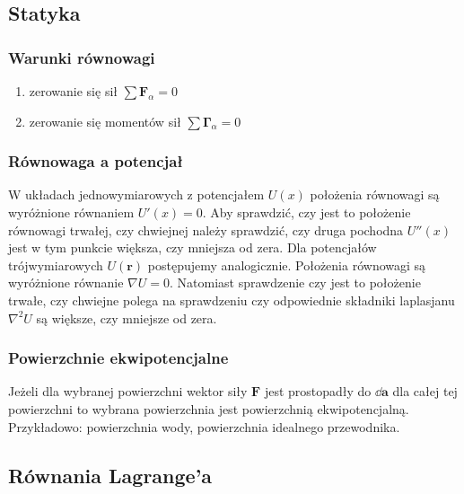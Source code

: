 \documentclass[../main.tex]{subfiles}
\begin{document}
\subsection{Statyka}
\subsubsection*{Warunki równowagi}
\begin{enumerate}
    \item zerowanie się sił \(\sum\mathbf{F}_\alpha=0\)
    \item zerowanie się momentów sił \(\sum\boldsymbol{\Gamma}_\alpha=0\)
\end{enumerate}
\subsubsection{Równowaga a potencjał}
W układach jednowymiarowych z potencjałem \(U(x)\) położenia równowagi są wyróżnione równaniem
\(U'(x)=0\). Aby sprawdzić, czy jest to położenie równowagi trwałej, czy chwiejnej należy sprawdzić,
czy druga pochodna \(U''(x)\) jest w tym punkcie większa, czy mniejsza od zera. Dla potencjałów
trójwymiarowych \(U(\mathbf{r})\) postępujemy analogicznie. Położenia równowagi są wyróżnione
równanie \(\nabla U=0\). Natomiast sprawdzenie czy jest to położenie trwałe, czy chwiejne polega na
sprawdzeniu czy odpowiednie składniki laplasjanu \(\nabla^2U\) są większe, czy mniejsze od zera.
\subsubsection{Powierzchnie ekwipotencjalne}
Jeżeli dla wybranej powierzchni wektor siły \(\mathbf{F}\) jest prostopadły do \(\dd\mathbf{a}\) dla
całej tej powierzchni to wybrana powierzchnia jest powierzchnią ekwipotencjalną. Przykładowo:
powierzchnia wody, powierzchnia idealnego przewodnika.

\subsection{Równania Lagrange'a}
\end{document}
